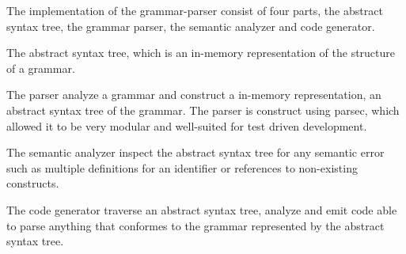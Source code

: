 The implementation of the grammar-parser consist of four parts, the abstract syntax tree, the grammar parser, the semantic analyzer and code generator. 

The abstract syntax tree, which is an in-memory representation of the structure of a grammar.

 The parser analyze a grammar and construct a in-memory representation, an abstract syntax tree of the grammar.  The parser is construct using parsec, which allowed it to be very modular and well-suited for test driven development.

The semantic analyzer inspect the abstract syntax tree for any semantic error such as multiple definitions for an identifier or references to non-existing constructs.

The code generator traverse an abstract syntax tree, analyze and emit code able to parse anything that conformes to the grammar represented by the abstract syntax tree.

